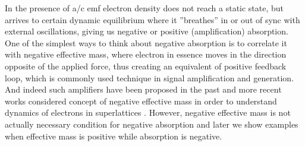 \documentclass[40pt,letterpaper,physrev]{article}
\begin{document}
    In the presence of a/c emf electron density does not reach a static state, but arrives to certain dynamic 
    equilibrium where it ”breathes” in or out of sync with external oscillations, giving us negative or positive
    (amplification) absorption. One of the simplest ways to think about negative absorption is to correlate it with
    negative effective mass, where electron in essence moves in the direction opposite of the applied force, thus 
    creating an equivalent of positive feedback loop, which is commonly used technique in signal amplification and
    generation. And indeed such amplifiers have been proposed in the past \cite{PhysRev.109.1856} and more recent 
    works considered concept of negative effective mass in order to understand dynamics of electrons in
    superlattices \cite{Gribnikov2002276}. However, negative effective mass is not actually necessary condition 
    for negative absorption and later we show examples when effective mass is positive while absorption is
    negative.
    
\end{document}
